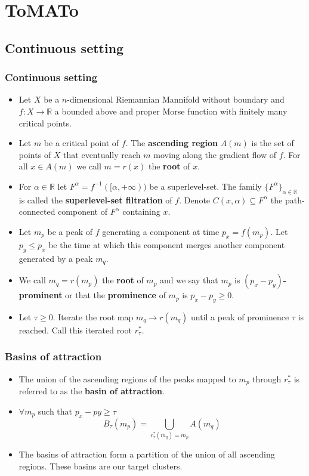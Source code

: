 \documentclass{beamer}
\theoremstyle{definition}
\newcommand{\R}{\mathbb{R}}
\begin{document}
\section{ToMATo}
\subsection{Continuous setting}
\begin{frame}[fragile]
\frametitle{Continuous setting}
\begin{itemize}
\item<1-> Let $X$ be a $n$-dimensional Riemannian Mannifold without boundary and $f:X\to\R$ a bounded above and proper Morse function with finitely many critical points.
\item<2-> Let $m$ be a critical point of $f$. The \textbf{ascending region} $A(m)$ is the set of points of $X$ that eventually reach $m$ moving along the gradient flow of $f$. For all $x\in A(m)$ we call $m=r(x)$ the \textbf{root} of $x$.

\item<3-> For $\alpha\in\R$ let $F^\alpha=f^{-1}([\alpha,+\infty))$ be a superlevel-set. The family $\{F^\alpha\}_{\alpha\in\R}$ is called the \textbf{superlevel-set filtration} of $f$. Denote $C(x,\alpha)\subseteq F^\alpha$ the path-connected component of $F^\alpha$ containing $x$. %
\end{itemize}
\end{frame}

\begin{frame}
\begin{itemize}
\item<1-> Let $m_p$ be a peak of $f$ generating a component at time $p_x=f(m_p)$. Let $p_y\leq p_x$ be the time at which this component merges another component generated by a peak $m_q$. %
\item<2->We call $m_q=r(m_p)$ the \textbf{root} of $m_p$ and we say that $m_p$ is \textbf{$(p_x-p_y)$-prominent} or that the \textbf{prominence} of $m_p$ is $p_x-p_y\geq 0$.
\item<3-> Let $\tau\geq 0$. Iterate the root map $m_q\to r(m_q)$ until a peak of prominence $\tau$ is reached. Call this iterated root $r^*_\tau$.
\end{itemize}
\end{frame}
\begin{frame}
\frametitle{Basins of attraction}
\begin{itemize}
\item<1-> The union of the ascending regions of the peaks mapped to $m_p$ through $r^*_\tau$ is referred to as the \textbf{basin of attraction}.
\item<2-> $\forall m_p$ such that $p_x - py \geq\tau$
\[B_\tau(m_p)=\bigcup_{r^*_\tau(m_q)=m_p} A(m_q)\]
\item<3->[]The basins of attraction form a partition of the union of all ascending
regions. These basins are our target clusters.
\end{itemize}

\end{frame}
\end{document}

